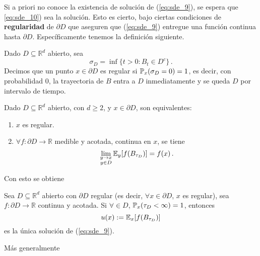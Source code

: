 \newp Si a priori no conoce la existencia de solución de (\ref{eq:sde_9}), se espera que \ref{eq:sde_10}) sea la solución. Esto es cierto, bajo ciertas condiciones de \textbf{regularidad} de $\partial D$ que aseguren que (\ref{eq:sde_9}) entregue una función continua hasta $\partial D$. Específicamente tenemos la definición siguiente.
\begin{definition}
Dado $D \subseteq \mathbb{R}^{d}$ abierto, sea 
\begin{equation*}
    \sigma_D = \inf \{ t> 0: B_t \in D^{c}\} \,.
\end{equation*}
Decimos que un punto $x \in \partial D$ es regular si $\P_x (\sigma_D = 0) =1$, es decir, con probabilidad $0$, la trayectoria de $B$ entra a $D$ inmediatamente y se queda $D$ por intervalo de tiempo.
\end{definition}

\begin{theorem}
Dado $D \subseteq \mathbb{R}^{d}$ abierto, con $d \ge  2$, y $x \in \partial D$, son equivalentes: 
\begin{enumerate}
    \item $x$ es regular.
    \item $\forall  f : \partial D \to \mathbb{R}$  medible y acotada, continua en $x$, se tiene 
        \begin{equation*}
            \lim_{\substack{y \to  x \\ y \in D}} \E_{y} [f(B_{\tau_D})] = f(x) \,.
        \end{equation*}
\end{enumerate}
\end{theorem}

Con esto se obtiene 
\begin{theorem}
    Sea $D \subseteq \mathbb{R}^{d}$ abierto con $\partial D$ regular (es decir, $\forall x \in \partial D$, $x$ es regular), sea $f : \partial D \to  \mathbb{R}$ continua y acotada. Si $\forall  \in D$, $\P_{x} (\tau_D < \infty ) = 1$, entonces 
    \begin{equation*}
        u(x) := \E_{x} [f(B_{\tau_D})]
    \end{equation*}
    es la única solución de (\ref{eq:sde_9}).
\end{theorem}

Más generalmente 

